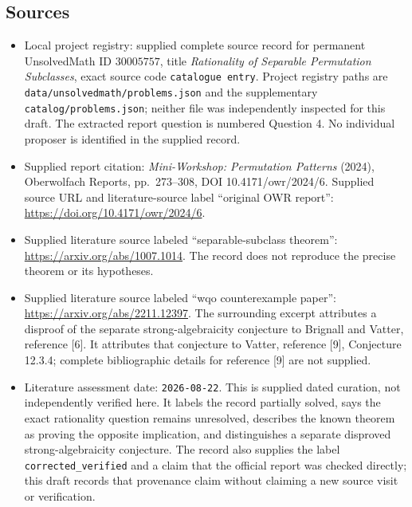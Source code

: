 \documentclass[11pt]{article}
\begin{document}
\subsection{Sources}
\begin{itemize}
\item Local project registry: supplied complete source record for permanent UnsolvedMath ID \(30005757\), title \emph{Rationality of Separable Permutation Subclasses}, exact source code \texttt{catalogue entry}. Project registry paths are \texttt{data/unsolvedmath/problems.json} and the supplementary \texttt{catalog/problems.json}; neither file was independently inspected for this draft. The extracted report question is numbered Question 4. No individual proposer is identified in the supplied record.
\item Supplied report citation: \emph{Mini-Workshop: Permutation Patterns} (2024), Oberwolfach Reports, pp.\ 273--308, DOI 10.4171/owr/2024/6. Supplied source URL and literature-source label ``original OWR report'': \url{https://doi.org/10.4171/owr/2024/6}.
\item Supplied literature source labeled ``separable-subclass theorem'': \url{https://arxiv.org/abs/1007.1014}. The record does not reproduce the precise theorem or its hypotheses.
\item Supplied literature source labeled ``wqo counterexample paper'': \url{https://arxiv.org/abs/2211.12397}. The surrounding excerpt attributes a disproof of the separate strong-algebraicity conjecture to Brignall and Vatter, reference [6]. It attributes that conjecture to Vatter, reference [9], Conjecture 12.3.4; complete bibliographic details for reference [9] are not supplied.
\item Literature assessment date: \texttt{2026-08-22}. This is supplied dated curation, not independently verified here. It labels the record partially solved, says the exact rationality question remains unresolved, describes the known theorem as proving the opposite implication, and distinguishes a separate disproved strong-algebraicity conjecture. The record also supplies the label \texttt{corrected\_verified} and a claim that the official report was checked directly; this draft records that provenance claim without claiming a new source visit or verification.
\end{itemize}
\end{document}
